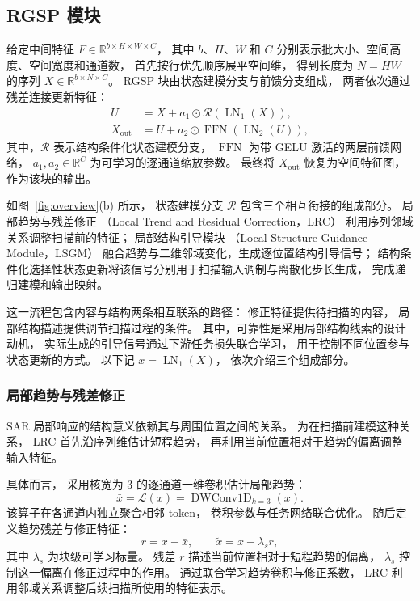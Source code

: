 \documentclass[journal]{IEEEtran}
\begin{document}
\subsection{RGSP 模块}
\label{sec:rgsp}

给定中间特征
$F\in\mathbb{R}^{b\times H\times W\times C}$，
其中 $b$、$H$、$W$ 和 $C$
分别表示批大小、空间高度、空间宽度和通道数，
首先按行优先顺序展平空间维，
得到长度为 $N=HW$ 的序列
$X\in\mathbb{R}^{b\times N\times C}$。
RGSP 块由状态建模分支与前馈分支组成，
两者依次通过残差连接更新特征：
\begin{equation}
\begin{aligned}
U
&=
X+a_1\odot
\mathcal{R}\left(\operatorname{LN}_1(X)\right),
\\
X_{\mathrm{out}}
&=
U+a_2\odot
\operatorname{FFN}\left(\operatorname{LN}_2(U)\right),
\end{aligned}
\label{eq:rgsp_block}
\end{equation}
其中，$\mathcal{R}$ 表示结构条件化状态建模分支，
$\operatorname{FFN}$ 为带 GELU 激活的两层前馈网络，
$a_1,a_2\in\mathbb{R}^{C}$
为可学习的逐通道缩放参数。
最终将 $X_{\mathrm{out}}$ 恢复为空间特征图，
作为该块的输出。

如图~\ref{fig:overview}(b) 所示，
状态建模分支 $\mathcal{R}$ 包含三个相互衔接的组成部分。
局部趋势与残差修正
（Local Trend and Residual Correction，LRC）
利用序列邻域关系调整扫描前的特征；
局部结构引导模块
（Local Structure Guidance Module，LSGM）
融合趋势与二维邻域变化，生成逐位置结构引导信号；
结构条件化选择性状态更新将该信号分别用于扫描输入调制与离散化步长生成，
完成递归建模和输出映射。

这一流程包含内容与结构两条相互联系的路径：
修正特征提供待扫描的内容，
局部结构描述提供调节扫描过程的条件。
其中，可靠性是采用局部结构线索的设计动机，
实际生成的引导信号通过下游任务损失联合学习，
用于控制不同位置参与状态更新的方式。
以下记
$x=\operatorname{LN}_1(X)$，
依次介绍三个组成部分。


\subsubsection{局部趋势与残差修正}
\label{sec:lrc}

SAR 局部响应的结构意义依赖其与周围位置之间的关系。
为在扫描前建模这种关系，
LRC 首先沿序列维估计短程趋势，
再利用当前位置相对于趋势的偏离调整输入特征。

具体而言，
采用核宽为 $3$ 的逐通道一维卷积估计局部趋势：
\begin{equation}
\bar{x}
=
\mathcal{L}(x)
=
\operatorname{DWConv1D}_{k=3}(x).
\label{eq:local_trend}
\end{equation}
该算子在各通道内独立聚合相邻 token，
卷积参数与任务网络联合优化。
随后定义趋势残差与修正特征：
\begin{equation}
r=x-\bar{x},
\qquad
\tilde{x}=x-\lambda_s r,
\label{eq:residual}
\end{equation}
其中 $\lambda_s$ 为块级可学习标量。
残差 $r$ 描述当前位置相对于短程趋势的偏离，
$\lambda_s$ 控制这一偏离在修正过程中的作用。
通过联合学习趋势卷积与修正系数，
LRC 利用邻域关系调整后续扫描所使用的特征表示。
\end{document}
